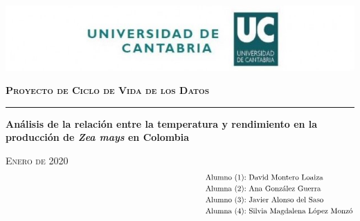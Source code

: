 \documentclass[12pt, spanish]{article}
\begin{document}
\begin{titlepage}
	\centering
	\includegraphics[width=1\textwidth]{header.jpg}\par\vspace{1cm}
	\vspace{1cm}
	{\LARGE\bfseries \textsc{Proyecto de Ciclo de Vida de los Datos}\par}
	
	\noindent\rule{15cm}{1pt}
	\vspace{3cm}
	
	{\Large \textbf{Análisis de la relación entre la temperatura y rendimiento en la producción de \textit{Zea mays} en Colombia}\par}
	\vfill
	\begin{flushright}
	{\large \textsc{Enero de 2020}} \\
	\vspace{\baselineskip}
	 \begin{align*}
	 \hspace{8.5cm}& & & &\text{Alumno (1):} &\ \text{David Montero Loaiza}\\
	 \hspace{8.5cm}& & & &\text{Alumna (2):} &\ \text{Ana González Guerra}\\
	& & & &\text{Alumno (3):} &\ \text{Javier Alonso del Saso}\\
	& & & &\text{Alumna (4):} &\ \text{Silvia Magdalena López Monzó}\\
	 \end{align*}
	\end{flushright}
\end{titlepage}
\renewcommand{\refname}{Referencias} %

%

\renewcommand{\contentsname}{Índice}

\pagestyle{headings}%
\end{document}
